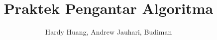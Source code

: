 \documentclass[a4paper,11pt]{report}
\author{Hardy Huang, Andrew Jauhari, Budiman}
\title{Praktek Pengantar Algoritma}
\begin{document}
\renewcommand\contentsname{Daftar Isi}
\tableofcontents \clearpage

\renewcommand{\chaptername}{Modul}
\renewcommand{\figurename}{Gambar}
\renewcommand{\appendixname}{Lampiran}

%
%
%
%
%
%
%
%
\appendix
%
%
\end{document}
